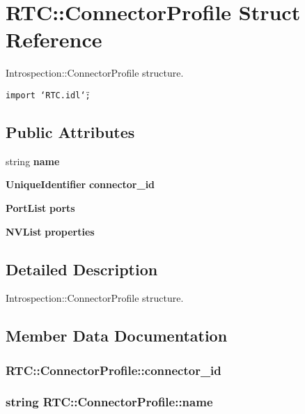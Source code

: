 \section{RTC::Connector\-Profile Struct Reference}
\label{structRTC_1_1ConnectorProfile}
Introspection::Connector\-Profile structure.  


{\tt import \char`\"{}RTC.idl\char`\"{};}

\subsection*{Public Attributes}
\begin{CompactItemize}
\item 
string {\bf name}
\item 
{\bf Unique\-Identifier} {\bf connector\_\-id}
\item 
{\bf Port\-List} {\bf ports}
\item 
{\bf NVList} {\bf properties}
\end{CompactItemize}


\subsection{Detailed Description}
Introspection::Connector\-Profile structure. 



\subsection{Member Data Documentation}
\subsubsection{ {\bf RTC::Connector\-Profile::connector\_\-id}}\label{structRTC_1_1ConnectorProfile_RTC_1_1ConnectorProfileo1}


\subsubsection{\setlength{\rightskip}{0pt plus 5cm}string {\bf RTC::Connector\-Profile::name}}\label{structRTC_1_1ConnectorProfile_RTC_1_1ConnectorProfileo0}


